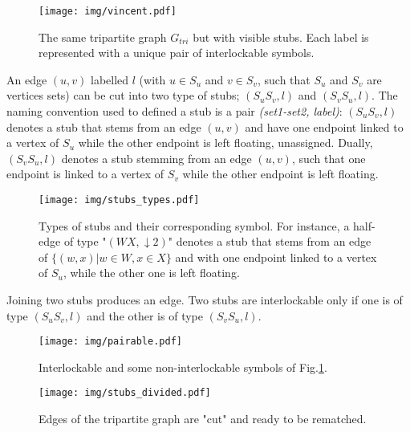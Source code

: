 \documentclass[table]{report}
\begin{document}
\begin{figure}[h]%
\centering
\texttt{[image: img/vincent.pdf]}
\caption{The same tripartite graph $G_{tri}$ but with visible stubs. Each label is represented with a unique pair of interlockable symbols.}
\label{fig:vincent}
\end{figure}
\FloatBarrier


An edge $(u,v)$ labelled $l$ (with $u \in S_u$ and $v \in S_v$, such that $S_u$ and $S_v$ are vertices sets) can be cut into two type of stubs; $(S_uS_v, l)$ and $(S_vS_u, l)$. The naming convention used to defined a stub is a pair \textit{(set1-set2, label)}: $(S_uS_v, l)$ denotes a stub that stems from an edge $(u,v)$ and have one endpoint linked to a vertex of $S_u$ while the other endpoint is left floating, unassigned. %
Dually, $(S_vS_u, l)$ denotes a stub stemming from an edge $(u,v)$, such that one endpoint is linked to a vertex of $S_v$ while the other endpoint is left floating.%



\begin{figure}[h]%
\centering
\texttt{[image: img/stubs\_types.pdf]}
\caption{Types of stubs and their corresponding symbol. For instance, a half-edge of type "$(WX, \downarrow 2)$" denotes a stub that stems from an edge of $ \{(w,x) | w \in W, x \in X \}$ and with one endpoint linked to a vertex of $S_u$, while the other one is left floating.}
\label{fig:stubs_types}
\end{figure}
\FloatBarrier


Joining two stubs produces an edge. Two stubs are interlockable only if one is of type $(S_uS_v, l)$ and the other is of type $(S_vS_u, l)$. %



\begin{figure}[h]%
\centering
\texttt{[image: img/pairable.pdf]}
\caption{Interlockable and some non-interlockable symbols of Fig.\ref{fig:vincent}. }
\label{fig:pairable}
\end{figure}
\FloatBarrier

\begin{figure}[h]%
\centering
\texttt{[image: img/stubs\_divided.pdf]}
\caption{Edges of the tripartite graph are "cut" and ready to be rematched.}
\label{fig:graphs}
\end{figure}
\FloatBarrier
\end{document}
